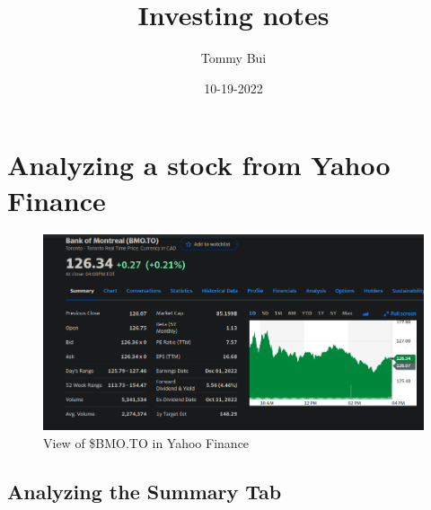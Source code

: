 \documentclass{article}
\title{Investing notes}
\date{10-19-2022}
\author{Tommy Bui}
\begin{document}
	\maketitle
	\newpage

	\section{Analyzing a stock from Yahoo Finance} 
	
	\begin{figure}[h!]
		\includegraphics[width=\linewidth]{InvestingPics/figure1.png}
		\caption{View of \$BMO.TO in Yahoo Finance}
		\label{fig:chart1}
	\end{figure}


	\subsection{Analyzing the Summary Tab}
\end{document}
